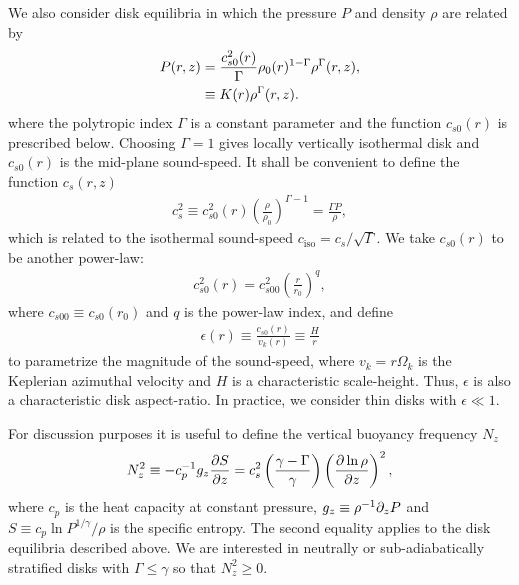 We also consider disk equilibria in which the pressure $P$ and density
$\rho$ are related by   
\begin{align}
  P(r,z) &= 
  \frac{c_{s0}^2(r)}{\Gamma}\rho_0(r)^{1-\Gamma}\rho^\Gamma(r,z),\notag\\
  & \equiv K(r)\rho^{\Gamma}(r,z). \label{eqm_press}
\end{align}
where the polytropic index $\Gamma$ is a  constant parameter  and the
function $c_{s0}(r)$ is prescribed below. Choosing $\Gamma=1$ gives 
locally vertically isothermal disk and $c_{s0}(r)$ is the mid-plane
sound-speed. %
It shall be convenient to define the function $c_s(r,z)$ 
\begin{align}
  c_s^2\equiv %
  c_{s0}^2(r)\left(\frac{\rho}{\rho_0}\right)^{\Gamma-1} =
  \frac{\Gamma P}{\rho}, 
\end{align}
which is related to the isothermal sound-speed $c_\mathrm{iso} =
c_s/\sqrt{\Gamma}$. We take $c_{s0}(r)$ to be another power-law:  
\begin{align}
  c_{s0}^2(r)=c_{s00}^2\left(\frac{r}{r_0}\right)^q, 
\end{align}
where $c_{s00}\equiv c_{s0}(r_0)$  and $q$ is the power-law index, and
define   
\begin{align}
  \epsilon(r) \equiv \frac{c_{s0}(r)}{v_k(r)} \equiv
  \frac{H}{r} 
\end{align}
to parametrize the magnitude of the sound-speed, where
$v_k=r\Omega_k$ is the Keplerian azimuthal velocity and
$H$ is a characteristic scale-height.  Thus, $\epsilon$
is also a characteristic disk aspect-ratio.  In practice, we consider
thin disks with $\epsilon \ll 1$. 

For discussion purposes it is useful to define the vertical buoyancy
frequency $N_z$ 
\begin{align}
  N_z^2 \equiv - c_p^{-1}g_z \frac{\partial S}{\partial z} = c_s^2 \left(\frac{\gamma -
      \Gamma}{\gamma}\right)\left(\frac{\partial\ln\rho}{\partial z}\right)^2,   
\end{align}
where $c_p$ is the heat capacity at constant pressure, $g_z\equiv
\rho^{-1}\partial_zP $ and $S\equiv c_p\ln{P^{1/\gamma}/\rho}$ is the
specific entropy. The second equality applies to the disk equilibria
described above. 
We are interested in
neutrally or sub-adiabatically stratified 
disks with $\Gamma\leq \gamma$ so that $N_z^2\geq0$.  


